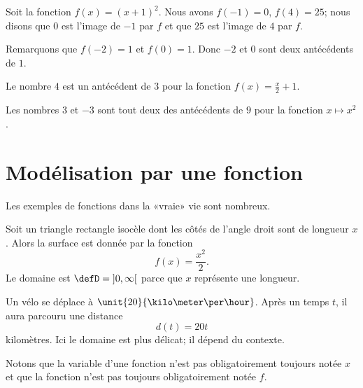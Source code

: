\begin{example}
    Soit la fonction \( f(x)=(x+1)^2\). Nous avons \( f(-1)=0\), \( f(4)=25\); nous disons que \( 0\) est l'image de \( -1\) par \( f\) et que \( 25\) est l'image de \( 4\) par \( f\).

    Remarquons que \( f(-2)=1\) et \( f(0)=1\). Donc \( -2\) et \( 0\) sont deux antécédents de \( 1\).
\end{example}

\begin{example}
    Le nombre \( 4\) est un antécédent de \( 3\) pour la fonction \( f(x)=\frac{ x }{ 2 }+1\).
\end{example}

\begin{example}
    Les nombres \( 3\) et \( -3\) sont tout deux des antécédents de \( 9\) pour la fonction \( x\mapsto x^2\).
\end{example}

\section{Modélisation par une fonction}

Les exemples de fonctions dans la «vraie» vie sont nombreux.

\begin{example}
    Soit un triangle rectangle isocèle dont les côtés de l'angle droit sont de longueur \( x\). Alors la surface est donnée par la fonction
    \begin{equation}
        f(x)=\frac{ x^2 }{2}.
    \end{equation}
    Le domaine est \( \defD=\mathopen] 0 , \infty \mathclose[\) parce que \( x\) représente une longueur.
\end{example}

\begin{example}
    Un vélo se déplace à \( \unit{20}{\kilo\meter\per\hour}\). Après un temps \( t\), il aura parcouru une distance
    \begin{equation}
        d(t)=20t
    \end{equation}
    kilomètres. Ici le domaine est plus délicat; il dépend du contexte.

    Notons que la variable d'une fonction n'est pas obligatoirement toujours notée \( x\) et que la fonction n'est pas toujours obligatoirement notée \( f\).
\end{example}

